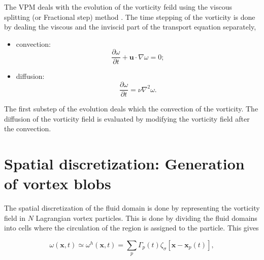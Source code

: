 The VPM deals with the evolution of the vorticity feild using the viscous splitting (or Fractional step) method \cite{Cottet2000a}. The time stepping of the vorticity is done by dealing the viscous and the inviscid part of the transport equation separately,

\begin{itemize}
\item convection:
\begin{equation}
\frac{\partial\omega}{\partial t} + \mathbf{u}\cdot\nabla\omega=0;
\label{eq:convectionEulerian}
\end{equation}
\item diffusion:
\begin{equation}
\frac{\partial\omega}{\partial t} = \nu\nabla^2\omega.
\end{equation}

\end{itemize}

The first substep of the evolution deals which the convection of the vorticity. The diffusion of the vorticity field is evaluated by modifying the vorticity field after the convection. 



\section{Spatial discretization: Generation of vortex blobs}

The spatial discretization of the fluid domain is done by representing the vorticity field in $N$ Lagrangian vortex particles. This is done by dividing the fluid domains into cells where the circulation of the region is assigned to the particle. This gives 

\begin{equation}
\omega\left(\mathbf{x},t\right) \simeq \omega^h\left(\mathbf{x},t\right) = \sum_{p}\Gamma_p\left(t\right)\zeta_{\sigma}\left[\mathbf{x}-\mathbf{x}_p\left(t\right)\right],
\end{equation}

